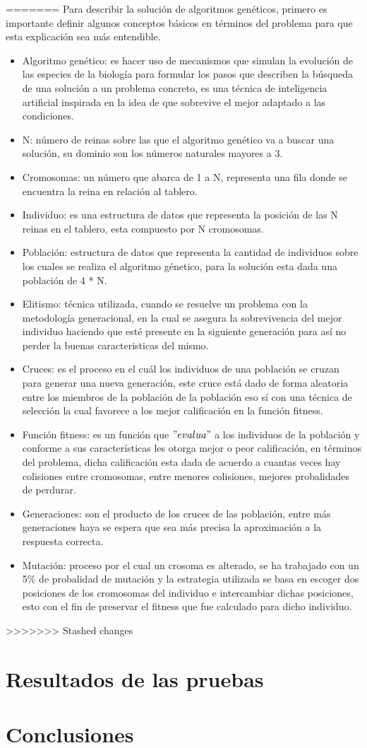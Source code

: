 \documentclass[12pt,a4paper]{article}
\begin{document}
=======
Para describir la solución de algoritmos genéticos, primero es importante definir algunos conceptos básicos en términos del problema para que esta explicación sea más entendible. 
\begin{itemize}
\item Algoritmo genético: es hacer uso de mecanismos que simulan la evolución de las especies de la biología para formular los pasos que describen la búsqueda de una solución a un problema concreto, es una técnica de inteligencia artificial inspirada en la idea de que sobrevive el mejor adaptado a las condiciones.
\item N: número de reinas sobre las que el algoritmo genético va a buscar una solución, su dominio son los números naturales mayores a 3.
\item Cromosomas: un número que abarca de 1 a N, representa una fila donde se encuentra la reina en relación al tablero.
\item Individuo: es una estructura de datos que representa la posición de las N reinas en el tablero, esta compuesto por N cromosomas.
\item Población: estructura de datos que representa la cantidad de individuos sobre los cuales se realiza el algoritmo génetico, para la solución esta dada una población de 4 * N.
\item Elitismo: técnica utilizada, cuando se resuelve un problema con la metodología generacional, en la cual se asegura la sobrevivencia del mejor individuo haciendo que esté presente en la siguiente generación para así no perder la buenas caracteristicas del mismo. 
\item Cruces: es el proceso en el cuál los individuos de una población se cruzan para generar una nueva generación, este cruce está dado de forma aleatoria entre los miembros de la población de la población eso sí con una técnica de selección la cual favorece a los mejor calificación en la función fitness.
\item Función fitness: es un función que $"evalua"$ a los individuos de la población y conforme a sus características les otorga mejor o peor calificación, en términos del problema, dicha calificación esta dada de acuerdo a cuantas veces hay colisiones entre cromosomas, entre menores colisiones, mejores probalidades de perdurar. 
\item Generaciones: son el producto de los cruces de las población, entre más generaciones haya se espera que sea más precisa la aproximación a la respuesta correcta.
\item Mutación: proceso por el cual un crosoma es alterado, se ha trabajado con un 5\% de probalidad de mutación y la estrategia utilizada se basa en escoger dos posiciones de los cromosomas del individuo e intercambiar dichas posiciones, esto con el fin de preservar el fitness que fue calculado para dicho individuo.
 
\end{itemize}
>>>>>>> Stashed changes
\pagebreak
\section{Resultados de las pruebas}


\pagebreak
\section{Conclusiones}
\end{document}

